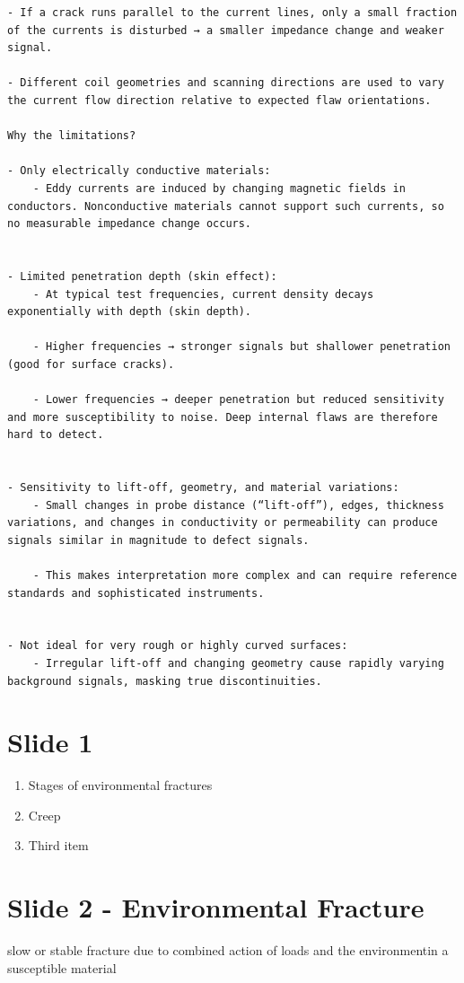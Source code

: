 \documentclass[11pt]{article}
\begin{document}
\begin{verbatim}
- If a crack runs parallel to the current lines, only a small fraction of the currents is disturbed → a smaller impedance change and weaker signal.

- Different coil geometries and scanning directions are used to vary the current flow direction relative to expected flaw orientations.

Why the limitations?

- Only electrically conductive materials:
	- Eddy currents are induced by changing magnetic fields in conductors. Nonconductive materials cannot support such currents, so no measurable impedance change occurs.


- Limited penetration depth (skin effect):
	- At typical test frequencies, current density decays exponentially with depth (skin depth).

	- Higher frequencies → stronger signals but shallower penetration (good for surface cracks).

	- Lower frequencies → deeper penetration but reduced sensitivity and more susceptibility to noise. Deep internal flaws are therefore hard to detect.


- Sensitivity to lift‑off, geometry, and material variations:
	- Small changes in probe distance (“lift‑off”), edges, thickness variations, and changes in conductivity or permeability can produce signals similar in magnitude to defect signals.

	- This makes interpretation more complex and can require reference standards and sophisticated instruments.


- Not ideal for very rough or highly curved surfaces:
	- Irregular lift‑off and changing geometry cause rapidly varying background signals, masking true discontinuities. 
\end{verbatim}


\newpage
\section{Slide 1}
\begin{enumerate}
    \item Stages of environmental fractures
    \item Creep
    \item Third item
\end{enumerate}

\section{Slide 2 - Environmental Fracture}
slow or stable fracture due to combined action of loads and the environmentin a susceptible material
\end{document}
